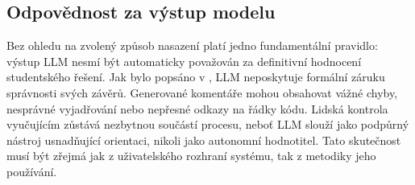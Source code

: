 \subsection*{Odpovědnost za výstup modelu}
\label{subsec:llm-output-responsibility}

Bez ohledu na zvolený způsob nasazení platí jedno fundamentální pravidlo: výstup LLM nesmí být automaticky považován za definitivní hodnocení studentského řešení.
Jak bylo popsáno v , LLM neposkytuje formální záruku správnosti svých závěrů.
Generované komentáře mohou obsahovat vážné chyby, nesprávné vyjadřování nebo nepřesné odkazy na řádky kódu.
Lidská kontrola vyučujícím zůstává nezbytnou součástí procesu, neboť LLM slouží jako podpůrný nástroj usnadňující orientaci, nikoli jako autonomní hodnotitel.
Tato skutečnost musí být zřejmá jak z uživatelského rozhraní systému, tak z metodiky jeho používání.

\endinput